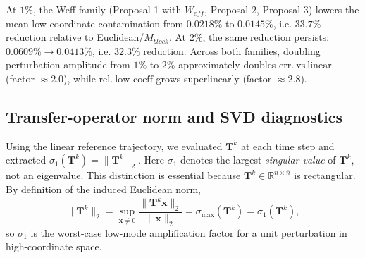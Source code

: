 \documentclass[11pt]{article}
\begin{document}
At \(1\%\), the Weff family (Proposal 1 with \(W_{eff}\), Proposal 2, Proposal 3) lowers the mean low-coordinate contamination from \(\num{0.0218}\%\) to \(\num{0.0145}\%\), i.e. \(33.7\%\) reduction relative to Euclidean/\(M_{block}\).
At \(2\%\), the same reduction persists: \(\num{0.0609}\%\rightarrow\num{0.0413}\%\), i.e. \(32.3\%\) reduction.
Across both families, doubling perturbation amplitude from \(1\%\) to \(2\%\) approximately doubles \(\mathrm{err.\ vs\ linear}\) (factor \(\approx 2.0\)), while \(\mathrm{rel.\ low\text{-}coeff}\) grows superlinearly (factor \(\approx 2.8\)).

\subsection*{Transfer-operator norm and SVD diagnostics}
Using the linear reference trajectory, we evaluated \(\mathbf T^k\) at each time step and extracted
\(\sigma_1(\mathbf T^k)=\|\mathbf T^k\|_2\).
Here \(\sigma_1\) denotes the largest \emph{singular value} of \(\mathbf T^k\), not an eigenvalue.
This distinction is essential because \(\mathbf T^k\in\mathbb R^{n\times\bar n}\) is rectangular.
By definition of the induced Euclidean norm,
\[
\|\mathbf T^k\|_2
=
\sup_{\mathbf x\neq 0}\frac{\|\mathbf T^k\mathbf x\|_2}{\|\mathbf x\|_2}
=
\sigma_{\max}(\mathbf T^k)
=
\sigma_1(\mathbf T^k),
\]
so \(\sigma_1\) is the worst-case low-mode amplification factor for a unit perturbation in high-coordinate space.
\end{document}
